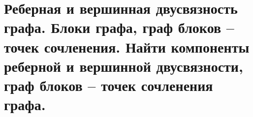 \section{Реберная и вершинная двусвязность графа. Блоки графа, граф блоков – точек сочленения. Найти 
компоненты реберной и вершинной двусвязности, граф блоков – точек сочленения графа.}